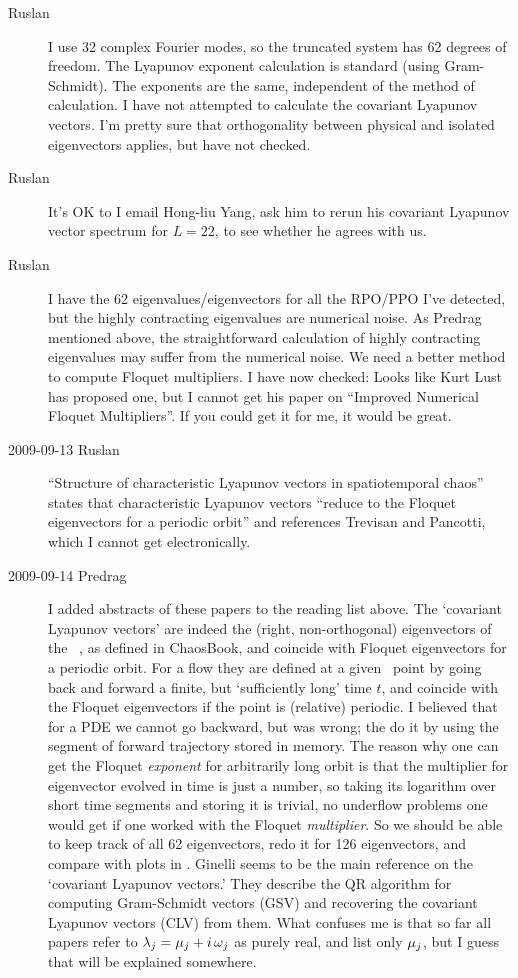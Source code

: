 \begin{description}
 \item[Ruslan] I use 32 complex Fourier modes, so the
truncated system has 62 degrees of freedom.  The Lyapunov
exponent calculation is standard (using Gram-Schmidt).  The
exponents are the same, independent of the method of
calculation.  I have not attempted to calculate the covariant
Lyapunov vectors. I'm pretty sure that
orthogonality between physical and isolated eigenvectors
applies, but have not checked.

 \item[Ruslan]
It's OK to I email Hong-liu
Yang, ask him to rerun his covariant
Lyapunov vector spectrum for $L=22$, to see whether he agrees
with us.

 \item[Ruslan]
I have the 62 eigenvalues/eigenvectors for all the RPO/PPO
I've detected, but the highly contracting eigenvalues are
 numerical noise. As Predrag mentioned above,
the straightforward calculation of highly contracting
eigenvalues may suffer from the numerical noise. We need a
better method to compute Floquet multipliers. I have now
checked:   Looks like {Kurt Lust} has proposed one, but I
cannot get his paper on ``Improved Numerical Floquet
Multipliers''. If you could
get it for me, it would be great.

\item[2009-09-13 Ruslan]
``Structure of characteristic Lyapunov
vectors in spatiotemporal chaos'' states
that characteristic Lyapunov vectors ``reduce to the Floquet
eigenvectors for a periodic orbit'' and references Trevisan
and Pancotti, which I cannot get electronically.

\item[2009-09-14 Predrag]
I added abstracts of these papers to the reading list above.
The `covariant Lyapunov vectors' are indeed the (right,
non-orthogonal) eigenvectors of the \jacobianM\ \jMps, as
defined in ChaosBook, and coincide with Floquet eigenvectors
for a periodic orbit. For a flow they are defined at a given
\statesp\ point by going back and forward a finite, but
`sufficiently long' time $t$, and coincide with the Floquet
eigenvectors if the point is (relative) periodic. I believed
that for a PDE we cannot go backward, but was wrong; the do
it by using the segment of forward trajectory stored in
memory. The reason why one can get the Floquet {\em exponent}
for arbitrarily long orbit is that the multiplier for eigenvector
evolved in time is just a number, so taking its logarithm over
short time segments and
storing it is trivial, no underflow problems one would get if
one worked with the Floquet {\em multiplier}. So we should be able
to keep track of all 62 eigenvectors, redo it for 126 eigenvectors,
and compare with plots in .
Ginelli \etal{} seems to be the main
reference on the `covariant Lyapunov vectors.' They describe
the QR algorithm for computing Gram-Schmidt vectors (GSV) and
recovering the covariant Lyapunov vectors (CLV) from them.
What confuses me is that so far all papers refer to $\Lyap_j
= \eigRe_j + i \, \eigIm_j$ as purely real, and list only
$\eigRe_j$, but I guess that will be explained somewhere.


\end{description}
